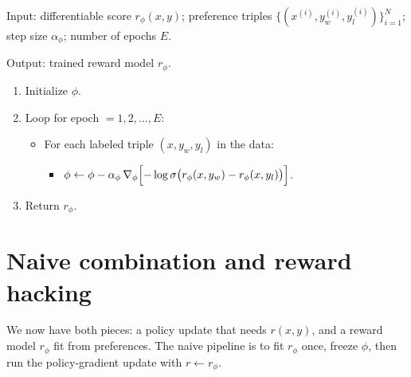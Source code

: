 \begin{implnote}
Input: differentiable score $r_\phi(x,y)$; preference triples $\{(x^{(i)},y_w^{(i)},y_l^{(i)})\}_{i=1}^{N}$; step size $\alpha_\phi$; number of epochs $E$.

Output: trained reward model $r_\phi$.

\begin{enumerate}
\item Initialize $\phi$.
\item Loop for epoch $=1,2,\ldots,E$:
\begin{itemize}
\item For each labeled triple $(x,y_w,y_l)$ in the data:
\begin{itemize}
\item $\phi\leftarrow\phi-\alpha_\phi\,\nabla_\phi\Bigl[-\log\sigma\bigl(r_\phi(x,y_w)-r_\phi(x,y_l)\bigr)\Bigr]$.
\end{itemize}
\end{itemize}
\item Return $r_\phi$.
\end{enumerate}

\end{implnote}

\section{Naive combination and reward hacking}

We now have both pieces: a policy update that needs $r(x,y)$, and a reward model $r_\phi$ fit from preferences. The naive pipeline is to fit $r_\phi$ once, freeze $\phi$, then run the policy-gradient update with $r\leftarrow r_\phi$.


